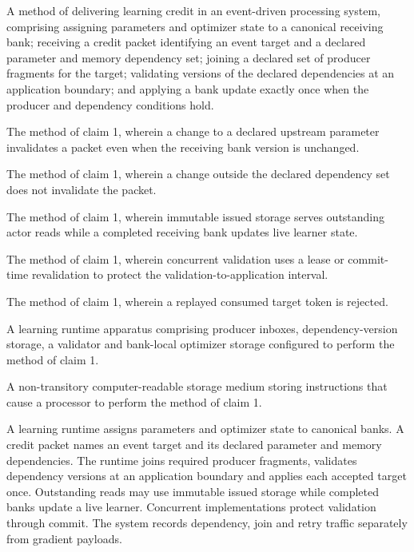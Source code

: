 \documentclass[pct]{sm-patent}
\begin{document}
\begin{patentclaims}

\item A method of delivering learning credit in an event-driven processing system, comprising assigning parameters and optimizer state to a canonical receiving bank; receiving a credit packet identifying an event target and a declared parameter and memory dependency set; joining a declared set of producer fragments for the target; validating versions of the declared dependencies at an application boundary; and applying a bank update exactly once when the producer and dependency conditions hold.

\item The method of claim 1, wherein a change to a declared upstream parameter invalidates a packet even when the receiving bank version is unchanged.

\item The method of claim 1, wherein a change outside the declared dependency set does not invalidate the packet.

\item The method of claim 1, wherein immutable issued storage serves outstanding actor reads while a completed receiving bank updates live learner state.

\item The method of claim 1, wherein concurrent validation uses a lease or commit-time revalidation to protect the validation-to-application interval.

\item The method of claim 1, wherein a replayed consumed target token is rejected.

\item A learning runtime apparatus comprising producer inboxes, dependency-version storage, a validator and bank-local optimizer storage configured to perform the method of claim 1.

\item A non-transitory computer-readable storage medium storing instructions that cause a processor to perform the method of claim 1.

\end{patentclaims}

\abstractstart

A learning runtime assigns parameters and optimizer state to canonical banks. A credit packet names an event target and its declared parameter and memory dependencies. The runtime joins required producer fragments, validates dependency versions at an application boundary and applies each accepted target once. Outstanding reads may use immutable issued storage while completed banks update a live learner. Concurrent implementations protect validation through commit. The system records dependency, join and retry traffic separately from gradient payloads.
\end{document}
